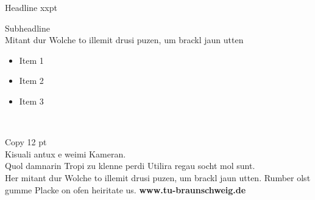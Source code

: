 \documentclass[a3paper,13pt,landscape]{tubsposter}
\begin{document}
\begin{tubsposter}[sender=bottom]
  \showtubslogo[left]
  \begin{posterrow}[bgcolor=tuRed100]{2}
    \color{tuWhite}
    { Headline xxpt\bigskip}
      
    { Subheadline\\
    Mitant dur Wolche to illemit drusi puzen, um brackl jaun utten}
    \vfill
    \large
    \begin{itemize}
      \item Item 1
      \item Item 2
      \item Item 3
    \end{itemize}
  \end{posterrow}
  \begin{posterrow}[bgcolor=tuGray20]{1}
    ~
  \end{posterrow}
  \begin{posterrow}[bgcolor=tuRed40]{3}
    Copy 12 pt\\
    Kisuali antux e weimi Kameran.\\
    Quol damnarin Tropi zu klenne perdi Utilira regau socht mol sunt.\\
    Her mitant dur Wolche to illemit drusi puzen, um brackl jaun utten. Rumber olst gumme Placke on ofen heiritate us.
    \vfill
    \textbf{www.tu-braunschweig.de}
  \end{posterrow}
\end{tubsposter}
\end{document}
